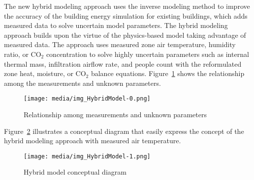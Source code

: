 The new hybrid modeling approach uses the inverse modeling method to improve the accuracy of the building energy simulation for existing buildings, which adds measured data to solve uncertain model parameters. The hybrid modeling approach builds upon the virtue of the physics-based model taking advantage of measured data. The approach uses measured zone air temperature, humidity ratio, or CO$_2$ concentration to solve highly uncertain parameters such as internal thermal mass, infiltration airflow rate, and people count with the reformulated zone heat, moisture, or CO$_2$ balance equations. Figure~\ref{fig:hybrid-model-solution-diagram} shows the relationship among the measurements and unknown parameters. 

\begin{figure}[h]
\begin{center}
\texttt{[image: media/img\_HybridModel-0.png]}
\caption{Relationship among measurements and unknown parameters}\protect \label{fig:hybrid-model-solution-diagram}
\end{center}
\end{figure}


Figure~\ref{fig:hybrid-model-conceptual-diagram} illustrates a conceptual diagram that easily express the concept of the hybrid modeling approach with measured air temperature. 

\begin{figure}[h]
\begin{center}
\texttt{[image: media/img\_HybridModel-1.png]}
\caption{Hybrid model conceptual diagram}\protect \label{fig:hybrid-model-conceptual-diagram}
\end{center}
\end{figure}



